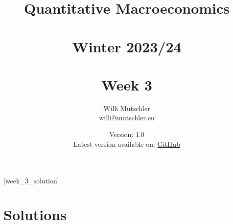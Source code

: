 
\newif\ifDisplaySolutions\DisplaySolutionstrue


\title{Quantitative Macroeconomics\\~\\Winter 2023/24\\~\\Week 3}
\author{Willi Mutschler\\willi@mutschler.eu}
\date{Version: 1.0\\Latest version available on: \href{https://github.com/wmutschl/Quantitative-Macroeconomics/releases/latest/download/week_3.pdf}{GitHub}}
\maketitle\thispagestyle{empty}

\newpage
{}[week_3_solution]
\tableofcontents\thispagestyle{empty}\newpage

\setcounter{page}{1}
\newpage
\newpage
\newpage
\newpage
\printbibliography
\newpage

\ifDisplaySolutions
\newpage
\appendix
\section{Solutions}

\fi
